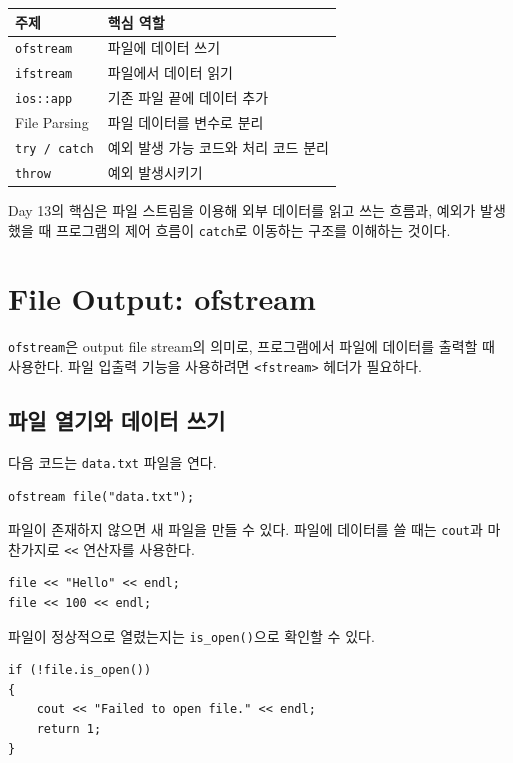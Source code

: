\documentclass[11pt,a4paper]{article}
\begin{document}
\begin{center}
\begin{tabular}{ll}
\toprule
주제 & 핵심 역할 \\
\midrule
\texttt{ofstream} & 파일에 데이터 쓰기 \\
\texttt{ifstream} & 파일에서 데이터 읽기 \\
\texttt{ios::app} & 기존 파일 끝에 데이터 추가 \\
File Parsing & 파일 데이터를 변수로 분리 \\
\texttt{try / catch} & 예외 발생 가능 코드와 처리 코드 분리 \\
\texttt{throw} & 예외 발생시키기 \\
\bottomrule
\end{tabular}
\end{center}

\begin{importantbox}
Day 13의 핵심은 파일 스트림을 이용해 외부 데이터를 읽고 쓰는 흐름과,
예외가 발생했을 때 프로그램의 제어 흐름이 \texttt{catch}로 이동하는 구조를 이해하는 것이다.
\end{importantbox}

\section{File Output: ofstream}
\texttt{ofstream}은 output file stream의 의미로, 프로그램에서 파일에 데이터를 출력할 때 사용한다.
파일 입출력 기능을 사용하려면 \texttt{<fstream>} 헤더가 필요하다.

\subsection{파일 열기와 데이터 쓰기}
다음 코드는 \texttt{data.txt} 파일을 연다.

\begin{lstlisting}
ofstream file("data.txt");
\end{lstlisting}

파일이 존재하지 않으면 새 파일을 만들 수 있다.
파일에 데이터를 쓸 때는 \texttt{cout}과 마찬가지로 \texttt{<<} 연산자를 사용한다.

\begin{lstlisting}
file << "Hello" << endl;
file << 100 << endl;
\end{lstlisting}

파일이 정상적으로 열렸는지는 \texttt{is\_open()}으로 확인할 수 있다.

\begin{lstlisting}
if (!file.is_open())
{
    cout << "Failed to open file." << endl;
    return 1;
}
\end{lstlisting}
\end{document}
